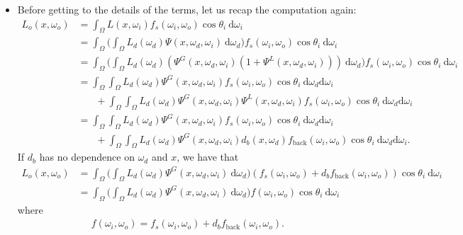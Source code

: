 \documentclass[10pt]{article}
\newcommand{\dee}{\mathrm{d}}
\begin{document}
\begin{itemize}
    \item Before getting to the details of the terms, let us recap the computation again:
    \begin{align*}
      L_o(x,\omega_o) 
      &= \int_{\Omega} L(x, \omega_i) f_s(\omega_i, \omega_o) \cos \theta_i\ \dee \omega_i \\
      &= \int_{\Omega} \bigg( \int_{\Omega} L_d(\omega_d) \Psi(x, \omega_d, \omega_i) \ \dee \omega_d \bigg) f_s(\omega_i, \omega_o) \cos \theta_i\ \dee \omega_i \\
      &= \int_{\Omega} \bigg( \int_{\Omega} L_d(\omega_d) ( \Psi^G(x, \omega_d, \omega_i)(1 + \Psi^L(x, \omega_d, \omega_i)) )  \ \dee \omega_d \bigg) f_s(\omega_i, \omega_o) \cos \theta_i\ \dee \omega_i \\
      &= \int_{\Omega} \int_{\Omega} L_d(\omega_d) \Psi^G(x, \omega_d, \omega_i) f_s(\omega_i, \omega_o) \cos \theta_i\ \dee \omega_d \dee \omega_i\\
      &\phantom{\ =\ } + \int_{\Omega} \int_{\Omega} L_d(\omega_d) \Psi^G(x, \omega_d, \omega_i) \Psi^L(x, \omega_d, \omega_i) f_s(\omega_i, \omega_o) \cos \theta_i\ \dee \omega_d \dee \omega_i \\
      &= \int_{\Omega} \int_{\Omega} L_d(\omega_d) \Psi^G(x, \omega_d, \omega_i) f_s(\omega_i, \omega_o) \cos \theta_i\ \dee \omega_d \dee \omega_i\\
      &\phantom{\ =\ } + \int_{\Omega} \int_{\Omega} L_d(\omega_d) \Psi^G(x, \omega_d, \omega_i) d_b(x,\omega_d) f_{\mathrm{back}}(\omega_i,\omega_o) \cos \theta_i\ \dee \omega_d \dee \omega_i.      
    \end{align*} 
    If $d_b$ has no dependence on $\omega_d$ and $x$, we have that
    \begin{align*}
      L_o(x,\omega_o) 
      &= \int_{\Omega} \bigg( \int_{\Omega} L_d(\omega_d) \Psi^G(x, \omega_d, \omega_i)\ \dee \omega_d \bigg) (f_s(\omega_i, \omega_o) + d_b f_{\mathrm{back}}(\omega_i, \omega_o)) \cos \theta_i\ \dee \omega_i \\
      &= \int_{\Omega} \bigg( \int_{\Omega} L_d(\omega_d) \Psi^G(x, \omega_d, \omega_i)\ \dee \omega_d \bigg) f(\omega_i, \omega_o) \cos \theta_i\ \dee \omega_i
    \end{align*}  
    where
    \begin{align*}
      f(\omega_i, \omega_o) = f_s(\omega_i, \omega_o) + d_b f_{\mathrm{back}}(\omega_i, \omega_o).
    \end{align*}
  \end{itemize}
\end{document}
